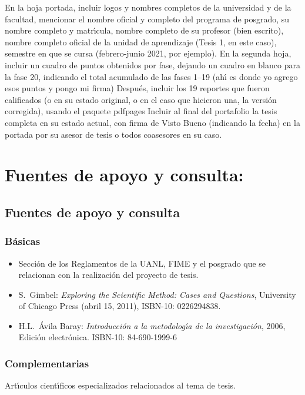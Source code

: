 \documentclass[10 pt]{article}
\begin{document}
En la hoja portada, incluir logos y nombres completos de la
universidad y de la facultad, mencionar el nombre oficial y completo
del programa de posgrado, su nombre completo y matr\'{\i}cula, nombre
completo de su profesor (bien escrito), nombre completo oficial de la
unidad de aprendizaje (Tesis 1, en este caso), semestre en que se
cursa (febrero-junio 2021, por ejemplo). En la segunda hoja, incluir
un cuadro de puntos obtenidos por fase, dejando un cuadro en blanco
para la fase 20, indicando el total acumulado de las fases 1--19 (ah\'{\i}
es donde yo agrego esos puntos y pongo mi firma) Despu\'{e}s, incluir los
19 reportes que fueron calificados (o en su estado original, o en el
caso que hicieron una, la versi\'{o}n corregida), usando el paquete
pdfpages Incluir al final del portafolio la tesis completa en su
estado actual, con firma de Visto Bueno (indicando la fecha) en la
portada por su asesor de tesis o todos coasesores en su caso.

\section{Fuentes de apoyo y consulta:}
\subsection{Fuentes de apoyo y consulta}
\subsubsection{B\'{a}sicas}

\begin{itemize}[itemsep=0em]
  
\item{Secci\'{o}n de los Reglamentos de la UANL, FIME y el posgrado que se relacionan con la realizaci\'{o}n del proyecto de tesis.}
  
\item{S.\ {\sc Gimbel}: {\em Exploring the Scientific Method:
      Cases and Questions}, University of Chicago Press (abril 15,
    2011), ISBN-10: 0226294838.}
  
\item{ H.L.\ {\sc \'{A}vila Baray}: {\em Introducci\'{o}n a la
      metodolog\'{\i}a de la investigaci\'{o}n}, 2006, Edici\'{o}n electr\'{o}nica. ISBN-10: 84-690-1999-6}
  
\end{itemize}

\subsubsection{Complementarias}

Art\'{\i}culos cient\'{\i}ficos especializados relacionados al tema de tesis.
 
\label{final} %


\end{document}
